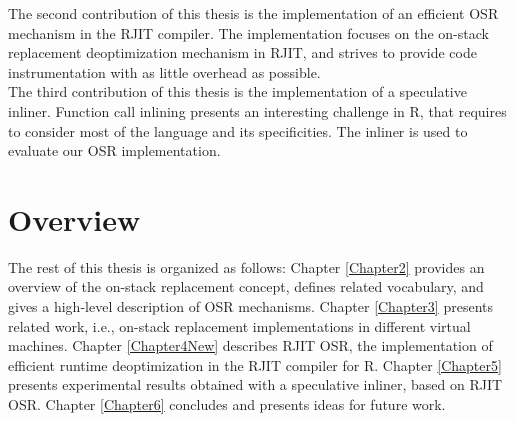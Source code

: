 The second contribution of this thesis is the implementation of an efficient OSR mechanism in the RJIT compiler. The implementation focuses on the on-stack replacement deoptimization mechanism in RJIT, and strives to provide code instrumentation with as little overhead as possible.\\

The third contribution of this thesis is the implementation of a speculative inliner. Function call inlining presents an interesting challenge in R, that requires to consider most of the language and its specificities. The inliner is used to evaluate our OSR implementation.\\

\section{Overview}

The rest of this thesis is organized as follows: Chapter \ref{Chapter2} provides an overview of the on-stack replacement concept, defines related vocabulary, and gives a high-level description of OSR mechanisms.
Chapter \ref{Chapter3} presents related work, i.e., on-stack replacement implementations in different virtual machines. 
Chapter \ref{Chapter4New} describes RJIT OSR, the implementation of efficient runtime deoptimization in the RJIT compiler for R.
Chapter \ref{Chapter5} presents experimental results obtained with a speculative inliner, based on RJIT OSR.
Chapter \ref{Chapter6} concludes and presents ideas for future work.\\ 





